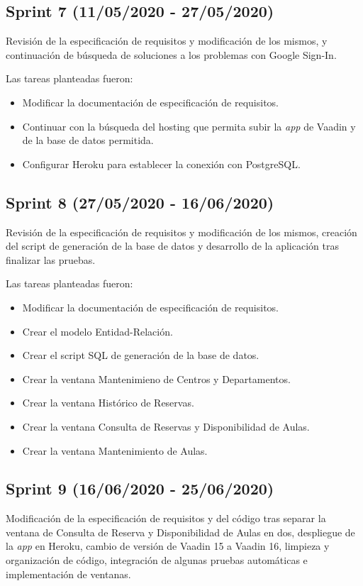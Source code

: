 \subsection{Sprint 7 (11/05/2020 - 27/05/2020)}
Revisión de la especificación de requisitos y modificación de los mismos, y continuación de búsqueda de soluciones a los problemas con Google Sign-In. 

Las tareas planteadas fueron:
\begin{itemize}
\tightlist
    \item Modificar la documentación de especificación de requisitos.
    \item Continuar con la búsqueda del hosting que permita subir la \textit{app} de Vaadin y de la base de datos permitida.
    \item Configurar Heroku para establecer la conexión con PostgreSQL.
\end{itemize}

\subsection{Sprint 8 (27/05/2020 - 16/06/2020)}
Revisión de la especificación de requisitos y modificación de los mismos, creación del script de generación de la base de datos y desarrollo de la aplicación tras finalizar las pruebas. 

Las tareas planteadas fueron:
\begin{itemize}
\tightlist
    \item Modificar la documentación de especificación de requisitos.
    \item Crear el modelo Entidad-Relación.
    \item Crear el script SQL de generación de la base de datos.
    \item Crear la ventana Mantenimieno de Centros y Departamentos.
    \item Crear la ventana Histórico de Reservas.
    \item Crear la ventana Consulta de Reservas y Disponibilidad de Aulas.
    \item Crear la ventana Mantenimiento de Aulas.
\end{itemize}

\subsection{Sprint 9 (16/06/2020 - 25/06/2020)}
Modificación de la especificación de requisitos y del código tras separar la ventana de Consulta de Reserva y Disponibilidad de Aulas en dos, despliegue de la \textit{app} en Heroku, cambio de versión de Vaadin 15 a Vaadin 16, limpieza y organización de código, integración de algunas pruebas automáticas e implementación de ventanas.

